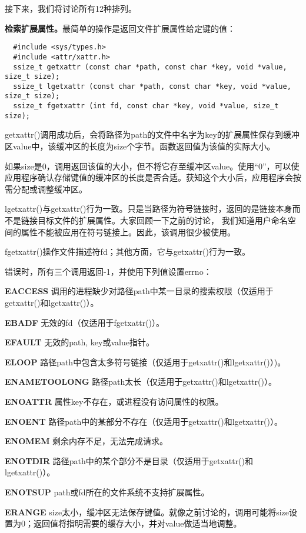 接下来，我们将讨论所有12种排列。 

\textbf{检索扩展属性。}最简单的操作是返回文件扩展属性给定键的值：

\begin{lstlisting}
  #include <sys/types.h>
  #include <attr/xattr.h>
  ssize_t getxattr (const char *path, const char *key, void *value, size_t size);
  ssize_t lgetxattr (const char *path, const char *key, void *value, size_t size);
  ssize_t fgetxattr (int fd, const char *key, void *value, size_t size);
\end{lstlisting}

getxattr()调用成功后，会将路径为path的文件中名字为key的扩展属性保存到缓冲区value中，该缓冲区的长度为size个字节。函数返回值为该值的实际大小。

如果size是0，调用返回该值的大小，但不将它存至缓冲区value。使用“0”，可以使应用程序确认存储键值的缓冲区的长度是否合适。获知这个大小后，应用程序会按需分配或调整缓冲区。

lgetxattr()与getxattr()行为一致。只是当路径为符号链接时，返回的是链接本身而不是链接目标文件的扩展属性。大家回顾一下之前的讨论， 我们知道用户命名空间的属性不能被应用在符号链接上。因此，该调用很少被使用。

fgetxattr()操作文件描述符fd；其他方面，它与getxattr()行为一致。

错误时，所有三个调用返回-1，并使用下列值设置errno：

\begin{eqlist*}
\item[\textbf{EACCESS}] 调用的进程缺少对路径path中某一目录的搜索权限（仅适用于getxattr()和lgetxattr()）。
\item[\textbf{EBADF}] 无效的fd（仅适用于fgetxattr()）。
\item[\textbf{EFAULT}] 无效的path, key或value指针。
\item[\textbf{ELOOP}] 路径path中包含太多符号链接（仅适用于getxattr()和lgetxattr()）)。
\item[\textbf{ENAMETOOLONG}] 路径path太长（仅适用于getxattr()和lgetxattr()）。
\item[\textbf{ENOATTR}] 属性key不存在，或进程没有访问属性的权限。
\item[\textbf{ENOENT}] 路径path中的某部分不存在（仅适用于getxattr()和lgetxattr()）。
\item[\textbf{ENOMEM}] 剩余内存不足，无法完成请求。
\item[\textbf{ENOTDIR}] 路径path中的某个部分不是目录（仅适用于getxattr()和lgetxattr()）。
\item[\textbf{ENOTSUP}] path或fd所在的文件系统不支持扩展属性。
\item[\textbf{ERANGE}] size太小，缓冲区无法保存键值。就像之前讨论的，调用可能将size设置为0；返回值将指明需要的缓存大小，并对value做适当地调整。
\end{eqlist*}

